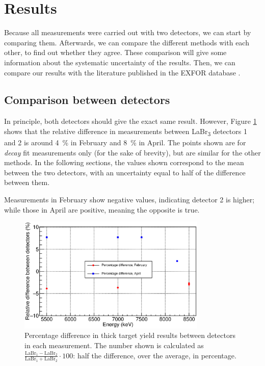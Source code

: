 \documentclass[a4paper,12pt]{report}
\begin{document}
\section{Results}
Because all measurements were carried out with two detectors, we can start by comparing them.
Afterwards, we can compare the different methods with each other, to find out whether they agree.
These comparison will give some information about the systematic uncertainty of the results.
Then, we can compare our results with the literature published in the EXFOR database \cite{jacobs}.

\subsection{Comparison between detectors}
In principle, both detectors should give the exact same result.
However, Figure \ref{decay_errors_rel_per_fixed} shows that the relative difference in measurements between LaBr\textsubscript{3} detectors 1 and 2 is around \qty{4}{\percent} in February and \qty{8}{\percent} in April.
The points shown are for \textit{decay} fit measurements only (for the sake of brevity), but are similar for the other methods.
In the following sections, the values shown correspond to the mean between the two detectors, with an uncertainty equal to half of the difference between them.

Measurements in February show negative values, indicating detector 2 is higher; while those in April are positive, meaning the opposite is true.
\\

\begin{figure}[H]
	\centering
	\includegraphics[width=0.80\textwidth]{decay_errors_rel_per_fixed.eps}
	\caption{Percentage difference in thick target yield results between detectors in each measurement.
	The number shown is calculated as $\frac{\text{LaBr}_1-\text{LaBr}_2}{\text{LaBr}_1+\text{LaBr}_2}\cdot 100$: half the difference, over the average, in percentage.}
	\label{decay_errors_rel_per_fixed}
\end{figure}
\end{document}
